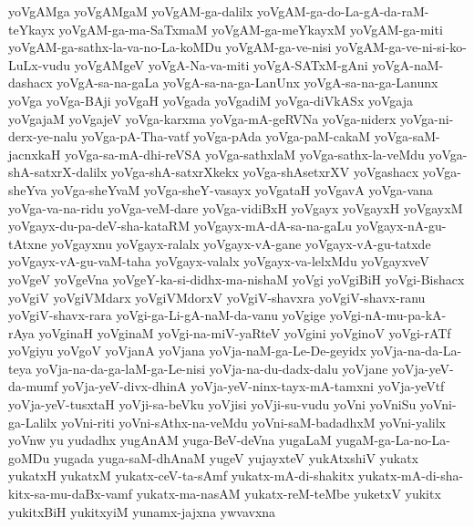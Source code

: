 {yoVgAMga
yoVgAMgaM
yoVgAM-ga-dalilx
yoVgAM-ga-do-La-gA-da-raM-teYkayx
yoVgAM-ga-ma-SaTxmaM
yoVgAM-ga-meYkayxM
yoVgAM-ga-miti
yoVgAM-ga-sathx-la-va-no-La-koMDu
yoVgAM-ga-ve-nisi
yoVgAM-ga-ve-ni-si-ko-LuLx-vudu
yoVgAMgeV
yoVgA-Na-va-miti
yoVgA-SATxM-gAni
yoVgA-naM-dashacx
yoVgA-sa-na-gaLa
yoVgA-sa-na-ga-LanUnx
yoVgA-sa-na-ga-Lanunx
yoVga
yoVga-BAji
yoVgaH
yoVgada
yoVgadiM
yoVga-diVkASx
yoVgaja
yoVgajaM
yoVgajeV
yoVga-karxma
yoVga-mA-geRVNa
yoVga-niderx
yoVga-ni-derx-ye-nalu
yoVga-pA-Tha-vatf
yoVga-pAda
yoVga-paM-cakaM
yoVga-saM-jacnxkaH
yoVga-sa-mA-dhi-reVSA
yoVga-sathxlaM
yoVga-sathx-la-veMdu
yoVga-shA-satxrX-dalilx
yoVga-shA-satxrXkekx
yoVga-shAsetxrXV
yoVgashacx
yoVga-sheYva
yoVga-sheYvaM
yoVga-sheY-vasayx
yoVgataH
yoVgavA
yoVga-vana
yoVga-va-na-ridu
yoVga-veM-dare
yoVga-vidiBxH
yoVgayx
yoVgayxH
yoVgayxM
yoVgayx-du-pa-deV-sha-kataRM
yoVgayx-mA-dA-sa-na-gaLu
yoVgayx-nA-gu-tAtxne
yoVgayxnu
yoVgayx-ralalx
yoVgayx-vA-gane
yoVgayx-vA-gu-tatxde
yoVgayx-vA-gu-vaM-taha
yoVgayx-valalx
yoVgayx-va-lelxMdu
yoVgayxveV
yoVgeV
yoVgeVna
yoVgeY-ka-si-didhx-ma-nishaM
yoVgi
yoVgiBiH
yoVgi-Bishacx
yoVgiV
yoVgiVMdarx
yoVgiVMdorxV
yoVgiV-shavxra
yoVgiV-shavx-ranu
yoVgiV-shavx-rara
yoVgi-ga-Li-gA-naM-da-vanu
yoVgige
yoVgi-nA-mu-pa-kA-rAya
yoVginaH
yoVginaM
yoVgi-na-miV-yaRteV
yoVgini
yoVginoV
yoVgi-rATf
yoVgiyu
yoVgoV
yoVjanA
yoVjana
yoVja-naM-ga-Le-De-geyidx
yoVja-na-da-La-teya
yoVja-na-da-ga-laM-ga-Le-nisi
yoVja-na-du-dadx-dalu
yoVjane
yoVja-yeV-da-mumf
yoVja-yeV-divx-dhinA
yoVja-yeV-ninx-tayx-mA-tamxni
yoVja-yeVtf
yoVja-yeV-tusxtaH
yoVji-sa-beVku
yoVjisi
yoVji-su-vudu
yoVni
yoVniSu
yoVni-ga-Lalilx
yoVni-riti
yoVni-sAthx-na-veMdu
yoVni-saM-badadhxM
yoVni-yalilx
yoVnw
yu
yudadhx
yugAnAM
yuga-BeV-deVna
yugaLaM
yugaM-ga-La-no-La-goMDu
yugada
yuga-saM-dhAnaM
yugeV
yujayxteV
yukAtxshiV
yukatx
yukatxH
yukatxM
yukatx-ceV-ta-sAmf
yukatx-mA-di-shakitx
yukatx-mA-di-sha-kitx-sa-mu-daBx-vamf
yukatx-ma-nasAM
yukatx-reM-teMbe
yuketxV
yukitx
yukitxBiH
yukitxyiM
yunamx-jajxna
ywvavxna
}
